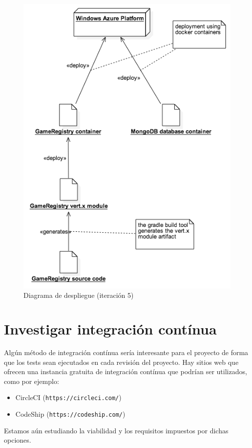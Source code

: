 \begin{figure}[h]
 \includegraphics[scale=0.6]{diagrams/docker_deployment_diagram.png}
 \caption{Diagrama de despliegue (iteración 5)}
 \label{fig:despliegue}
\end{figure} 


\section{Investigar integración contínua}
Algún método de integración contínua sería interesante para el proyecto de forma que los tests 
sean ejecutados en cada revisión del proyecto. Hay sitios web que ofrecen una instancia gratuita de
integración contínua que podrían ser utilizados, como por ejemplo:

\begin{itemize}
\item CircleCI (\texttt{https://circleci.com/})
\item CodeShip (\texttt{https://codeship.com/})
\end{itemize}

Estamos aún estudiando la viabilidad y los requisitos impuestos por dichas opciones.